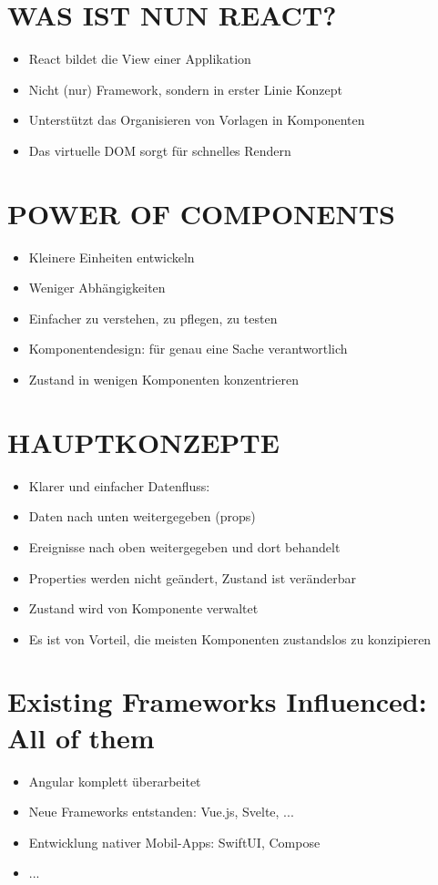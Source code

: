 \documentclass[10pt]{article}
\begin{document}
\section*{WAS IST NUN REACT?}
\begin{itemize}
  \item React bildet die View einer Applikation
  \item Nicht (nur) Framework, sondern in erster Linie Konzept
  \item Unterstützt das Organisieren von Vorlagen in Komponenten
  \item Das virtuelle DOM sorgt für schnelles Rendern
\end{itemize}

\section*{POWER OF COMPONENTS}
\begin{itemize}
  \item Kleinere Einheiten entwickeln
  \item Weniger Abhängigkeiten
  \item Einfacher zu verstehen, zu pflegen, zu testen
  \item Komponentendesign: für genau eine Sache verantwortlich
  \item Zustand in wenigen Komponenten konzentrieren
\end{itemize}

\section*{HAUPTKONZEPTE}
\begin{itemize}
  \item Klarer und einfacher Datenfluss:
  \item Daten nach unten weitergegeben (props)
  \item Ereignisse nach oben weitergegeben und dort behandelt
  \item Properties werden nicht geändert, Zustand ist veränderbar
  \item Zustand wird von Komponente verwaltet
  \item Es ist von Vorteil, die meisten Komponenten zustandslos zu konzipieren
\end{itemize}

\section*{Existing Frameworks Influenced: All of them}
\begin{itemize}
  \item Angular komplett überarbeitet
  \item Neue Frameworks entstanden: Vue.js, Svelte, ...
  \item Entwicklung nativer Mobil-Apps: SwiftUI, Compose
  \item ...
\end{itemize}
\end{document}
